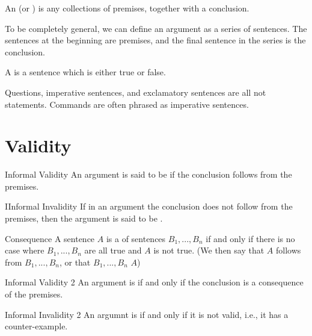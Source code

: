 \documentclass[12pt, a4paper, twoside, openright, titlepage]{book}
\begin{document}
\begin{defn}{}{}
    An  (or ) is any collections of premises, together with a conclusion.

    To be completely general, we can define an argument as a series of sentences. The sentences at the beginning are premises, and the final sentence in the series is the conclusion.
\end{defn}

\begin{defn}{}{}
    A  is a sentence which is either true or false.
\end{defn}


\begin{rmk}{}{}
    Questions, imperative sentences, and exclamatory sentences are all not statements. Commands are often phrased as imperative sentences.
\end{rmk}



\section{\textsection Validity}

\begin{defn}{Informal Validity}{}
    An argument is said to be  if the conclusion follows from the premises.
\end{defn}

\begin{defn}{IInformal Invalidity}{}
    If in an argument the conclusion does not follow from the premises, then the argument is said to be .
\end{defn}


\begin{defn}{Consequence}{}
    A sentence $A$ is a  of sentences $B_1,...,B_n$ if and only if there is no case where $B_1,...,B_n$ are all true and $A$ is not true. (We then say that $A$ follows from $B_1,...,B_n$, or that $B_1,...,B_n$  $A$)
\end{defn}


\begin{defn}{Informal Validity 2}{}
    An argument is  if and only if the conclusion is a consequence of the premises.
\end{defn}

\begin{defn}{Informal Invalidity 2}{}
    An argumnt is  if and only if it is not valid, i.e., it has a counter-example.
\end{defn}
\end{document}
